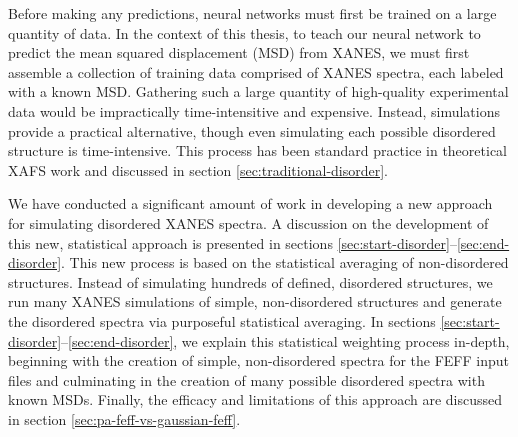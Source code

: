 
Before making any predictions, neural networks must first be trained on a large quantity of data. In the context of this thesis, to teach our neural network to predict the mean squared displacement (MSD) from XANES, we must first assemble a collection of training data comprised of XANES spectra, each labeled with a known MSD. Gathering such a large quantity of high-quality experimental data would be impractically time-intensitive and expensive. Instead, simulations provide a practical alternative, though even simulating each possible disordered structure is time-intensive. This process has been standard practice in theoretical XAFS work and discussed in section \ref{sec:traditional-disorder}. 

We have conducted a significant amount of work in developing a new approach for simulating disordered XANES spectra. A discussion on the development of this new, statistical approach is presented in sections \ref{sec:start-disorder}--\ref{sec:end-disorder}. This new process is based on the statistical averaging of non-disordered structures. Instead of simulating hundreds of defined, disordered structures, we run many XANES simulations of simple, non-disordered structures and generate the disordered spectra via purposeful statistical averaging. In sections \ref{sec:start-disorder}--\ref{sec:end-disorder}, we explain this statistical weighting process in-depth, beginning with the creation of simple, non-disordered spectra for the FEFF input files and culminating in the creation of many possible disordered spectra with known MSDs. Finally, the efficacy and limitations of this approach are discussed in section \ref{sec:pa-feff-vs-gaussian-feff}.

